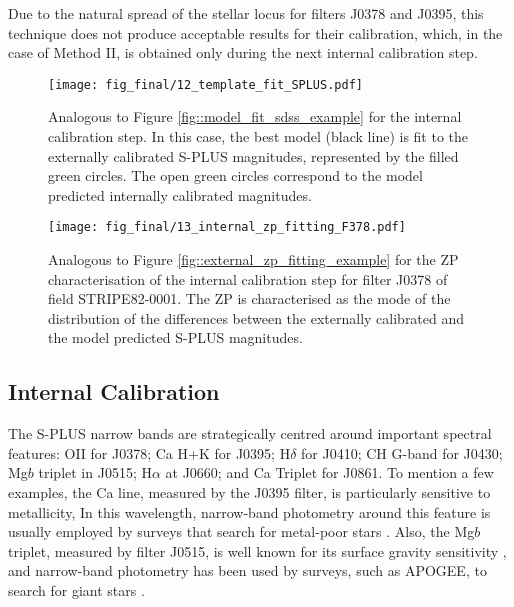 \documentclass[fleqn,usenatbib]{mnras}
\begin{document}
Due to the natural spread of the stellar locus for filters J0378 and J0395, this technique does not produce acceptable results for their calibration, which, in the case of Method II, is obtained only during the next internal calibration step.

\begin{figure*}
\begin{center}
\texttt{[image: fig\_final/12\_template\_fit\_SPLUS.pdf]}
\caption{\label{fig:model_fit_splus_example} Analogous to Figure \ref{fig::model_fit_sdss_example} for the internal calibration step. In this case, the best model (black line) is fit to the externally calibrated S-PLUS magnitudes, represented by the filled green circles. The open green circles correspond to the model predicted internally calibrated magnitudes.}
\end{center}
\end{figure*}

\begin{figure}
\begin{center}
\texttt{[image: fig\_final/13\_internal\_zp\_fitting\_F378.pdf]}
\caption{\label{fig:model_fit_splus_example2} Analogous to Figure \ref{fig::external_zp_fitting_example} for the ZP characterisation of the internal calibration step for filter J0378 of field STRIPE82-0001. The ZP is characterised as the mode of the distribution of the differences between the externally calibrated and the model predicted S-PLUS magnitudes.}
\end{center}
\end{figure}

\subsection{Internal Calibration}

The S-PLUS narrow bands are strategically centred around important spectral features: OII for J0378;  Ca H+K for J0395; H$\delta$ for J0410; CH G-band for J0430; Mg$b$ triplet in J0515; H$\alpha$ at J0660; and Ca Triplet for J0861. To mention a few examples, the Ca line, measured by the J0395 filter, is particularly sensitive to metallicity, In this wavelength, narrow-band photometry around this feature is usually employed by surveys that search for metal-poor stars \citep{Starkenburg+2017, Keller+2007}. Also, the Mg$b$ triplet, measured by filter J0515, is well known for its surface gravity sensitivity \citep{Geisler1984, Majewski+2000}, and narrow-band photometry has been used by surveys, such as APOGEE, to search for giant stars \citep{Zasowski+2013, Majewski+2016}. 
\end{document}
